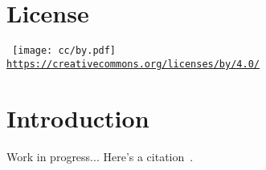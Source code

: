 
\thispagestyle{empty} %
\flushbottom %
\maketitle %



\section*{License}

    \scriptsize\noindent%
    \begin{minipage}{\columnwidth}
        \centering\tt
        \texttt{[image: cc/by.pdf]}\\[0.5\smallskipamount]
        {\scriptsize\url{https://creativecommons.org/licenses/by/4.0/}}
    \end{minipage}
    \normalsize



\tableofcontents



\section{Introduction}

    Work in progress... Here's a citation~\cite{2016-PhilippiPC+MattilaKK-JBrazSocMechSci}.

